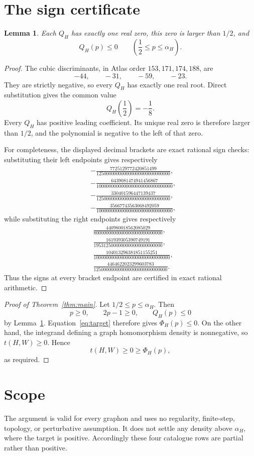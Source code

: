 \documentclass[11pt]{article}
\newtheorem{lemma}[theorem]{Lemma}
\begin{document}
\section{The sign certificate}

\begin{lemma}\label{lem:sign}
Each $Q_H$ has exactly one real zero, this zero is larger than $1/2$, and
\[
 Q_H(p)\leq0
 \qquad\left(\frac12\leq p\leq\alpha_H\right).
\]
\end{lemma}

\begin{proof}
The cubic discriminants, in Atlas order $153,171,174,188$, are
\[
 -44,\qquad -31,\qquad -59,\qquad -23.
\]
They are strictly negative, so every $Q_H$ has exactly one real root.
Direct substitution gives the common value
\[
 Q_H\!\left(\frac12\right)=-\frac18.
\]
Every $Q_H$ has positive leading coefficient.  Its unique real zero is
therefore larger than $1/2$, and the polynomial is negative to the left of
that zero.

For completeness, the displayed decimal brackets are exact rational sign
checks: substituting their left endpoints gives respectively
\[
\begin{split}
 &-\frac{7725129772420851499}{125000000000000000000000000000},\\
 &-\frac{6439081474941456867}{1000000000000000000000000000000},\\
 &-\frac{330401596447139437}{125000000000000000000000000000},\\
 &-\frac{35667743563068492059}{1000000000000000000000000000000},
\end{split}
\]
while substituting the right endpoints gives respectively
\[
\begin{split}
 &\frac{440980018562085029}{8000000000000000000000000000},\\
 &\frac{161939305390749191}{1953125000000000000000000000},\\
 &\frac{104013296381851155251}{1000000000000000000000000000000},\\
 &\frac{4464622023299603783}{125000000000000000000000000000}.
\end{split}
\]
Thus the signs at every bracket endpoint are certified in exact rational
arithmetic.
\end{proof}

\begin{proof}[Proof of Theorem~\ref{thm:main}]
Let $1/2\leq p\leq\alpha_H$.  Then
\[
 p\geq0,
 \qquad
 2p-1\geq0,
 \qquad
 Q_H(p)\leq0
\]
by Lemma~\ref{lem:sign}.  Equation~\eqref{eq:target} therefore gives
$\Phi_H(p)\leq0$.  On the other hand, the integrand defining a graph
homomorphism density is nonnegative, so $t(H,W)\geq0$.  Hence
\[
 t(H,W)\geq0\geq\Phi_H(p),
\]
as required.
\end{proof}

\section{Scope}

The argument is valid for every graphon and uses no regularity,
finite-step, topology, or perturbative assumption.  It does not settle any
density above $\alpha_H$, where the target is positive.  Accordingly these
four catalogue rows are partial rather than positive.
\end{document}
